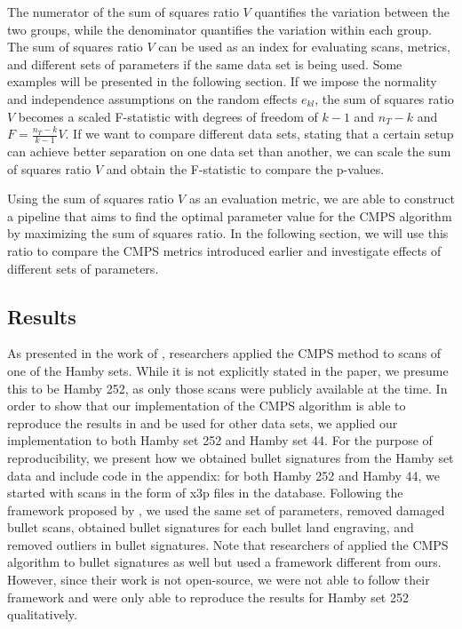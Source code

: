 The numerator of the sum of squares ratio \(V\) quantifies the variation
between the two groups, while the denominator quantifies the variation
within each group. The sum of squares ratio \(V\) can be used as an
index for evaluating scans, metrics, and different sets of parameters if
the same data set is being used. Some examples will be presented in the
following section. If we impose the normality and independence
assumptions on the random effects \(e_{kl}\), the sum of squares ratio
\(V\) becomes a scaled F-statistic with degrees of freedom of \(k-1\)
and \(n_T - k\) and \(F = \frac{n_T - k}{k- 1} V\). If we want to
compare different data sets, stating that a certain setup can achieve
better separation on one data set than another, we can scale the sum of
squares ratio \(V\) and obtain the F-statistic to compare the p-values.

Using the sum of squares ratio \(V\) as an evaluation metric, we are
able to construct a pipeline that aims to find the optimal parameter
value for the CMPS algorithm by maximizing the sum of squares ratio. In
the following section, we will use this ratio to compare the CMPS
metrics introduced earlier and investigate effects of different sets of
parameters.

\hypertarget{results}{%
\subsection{Results}\label{results}}

As presented in the work of \citet{cmps}, researchers applied the CMPS
method to scans of one of the Hamby sets. While it is not explicitly
stated in the paper, we presume this to be Hamby 252, as only those
scans were publicly available at the time. In order to show that our
implementation of the CMPS algorithm is able to reproduce the results in
\citet{cmps} and be used for other data sets, we applied our
implementation to both Hamby set 252 and Hamby set 44. For the purpose
of reproducibility, we present how we obtained bullet signatures from
the Hamby set data and include code in the appendix: for both Hamby 252
and Hamby 44, we started with scans in the form of x3p files in the
database. Following the framework proposed by \citet{aoas}, we used the
same set of parameters, removed damaged bullet scans, obtained bullet
signatures for each bullet land engraving, and removed outliers in
bullet signatures. Note that researchers of \citet{cmps} applied the
CMPS algorithm to bullet signatures as well but used a framework
different from ours. However, since their work is not open-source, we
were not able to follow their framework and were only able to reproduce
the results for Hamby set 252 qualitatively.


